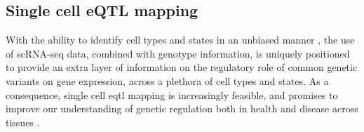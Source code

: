 















\newpage

\subsection{Single cell eQTL mapping}
\label{sec:sc_eqtl}

With the ability to identify cell types and states in an unbiased manner \cite{kolodziejczyk2015technology, trapnell2015defining}, the use of 
scRNA-seq data, combined with genotype information, is uniquely positioned to provide an extra layer 
of information on the regulatory role of common genetic variants
on
gene expression, across a plethora of cell types and states.
As a consequence, single cell \gls{eqtl} mapping 
is increasingly feasible,
and promises to improve our understanding of genetic regulation both in health and disease across tissues \cite{wills2013single, van2018single, sarkar2019discovery, jerber2020population, van2020single1, cuomo2020single}.
\\


